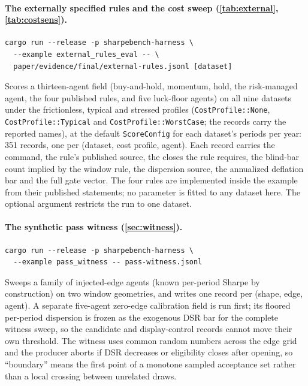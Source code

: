 \paragraph{The externally specified rules and the cost sweep (\cref{tab:external}, \cref{tab:costsens}).}
\begin{verbatim}
cargo run --release -p sharpebench-harness \
  --example external_rules_eval -- \
  paper/evidence/final/external-rules.jsonl [dataset]
\end{verbatim}
Scores a thirteen-agent field (buy-and-hold, momentum, hold, the risk-managed agent, the four published rules, and five luck-floor agents) on all nine datasets under the frictionless, typical and stressed profiles (\texttt{CostProfile::None}, \texttt{CostProfile::Typical} and \texttt{CostProfile::WorstCase}; the records carry the reported names), at the default \texttt{ScoreConfig} for each dataset's periods per year: 351 records, one per (dataset, cost profile, agent). Each record carries the command, the rule's published source, the closes the rule requires, the blind-bar count implied by the window rule, the dispersion source, the annualized deflation bar and the full gate vector. The four rules are implemented inside the example from their published statements; no parameter is fitted to any dataset here. The optional argument restricts the run to one dataset.

\paragraph{The synthetic pass witness (\cref{sec:witness}).}
\begin{verbatim}
cargo run --release -p sharpebench-harness \
  --example pass_witness -- pass-witness.jsonl
\end{verbatim}
Sweeps a family of injected-edge agents (known per-period Sharpe by construction) on two window geometries, and writes one record per (shape, edge, agent). A separate five-agent zero-edge calibration field is run first; its floored per-period dispersion is frozen as the exogenous DSR bar for the complete witness sweep, so the candidate and display-control records cannot move their own threshold. The witness uses common random numbers across the edge grid and the producer aborts if DSR decreases or eligibility closes after opening, so ``boundary'' means the first point of a monotone sampled acceptance set rather than a local crossing between unrelated draws.

